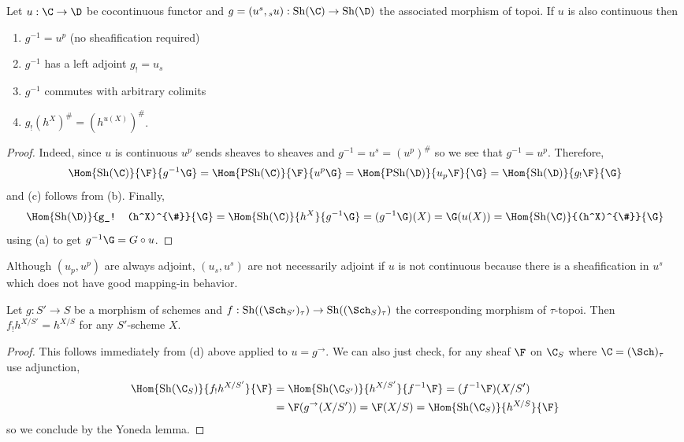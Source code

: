 \documentclass[12pt]{article}
\begin{document}
\begin{lemma}
Let $u : \C \to \D$ be cocontinuous functor and $g = (u^s, {}_s u) : \Sh(\C) \to \Sh(\D)$ the associated morphism of topoi. If $u$ is also continuous then
\begin{enumerate}
\item $g^{-1} = u^p$ (no sheafification required)
\item $g^{-1}$ has a left adjoint $g_! = u_s$
\item $g^{-1}$ commutes with arbitrary colimits
\item $g_! (h^{X})^{\#} = (h^{u(X)})^{\#}$.
\end{enumerate}
\end{lemma}

\begin{proof}
Indeed, since $u$ is continuous $u^p$ sends sheaves to sheaves and $g^{-1} = u^s = (u^p)^{\#}$ so we see that $g^{-1} = u^p$. Therefore, 
\begin{align*}
\Hom{\Sh(\C)}{\F}{g^{-1} \G} = \Hom{\PSh(\C)}{\F}{u^p \G} = \Hom{\PSh(\D)}{u_p \F}{\G} = \Hom{\Sh(\D)}{g_! \F}{\G} 
\end{align*}
and (c) follows from (b). Finally,
\[ \Hom{\Sh(\D)}{g_! (h^X)^{\#}}{\G} = \Hom{\Sh(\C)}{h^X}{g^{-1} \G} = (g^{-1} \G)(X) = \G(u(X)) = \Hom{\Sh(\C)}{(h^X)^{\#}}{\G} \]
using (a) to get $g^{-1} \G = G \circ u$.
\end{proof}

\begin{rmk}
Although $(u_p, u^p)$ are always adjoint, $(u_s, u^s)$ are not necessarily adjoint if $u$ is not continuous because there is a sheafification in $u^s$ which does not have good mapping-in behavior.
\end{rmk}


\begin{cor}
Let $g : S' \to S$ be a morphism of schemes and $f : \Sh((\Sch_{S'})_{\tau}) \to \Sh((\Sch_{S})_{\tau})$
the corresponding morphism of $\tau$-topoi. Then $f_! h^{X/S'} = h^{X/S}$ for any $S'$-scheme $X$.
\end{cor}

\begin{proof}
This follows immediately from (d) above applied to $u = g^{\to}$. We can also just check,
for any sheaf $\F$ on $\C_{S}$ where $\C = (\Sch)_{\tau}$ use adjunction,
\begin{align*}
\Hom{\Sh(\C_{S})}{f_! h^{X/S'}}{\F} & = \Hom{\Sh(\C_{S'})}{h^{X/S'}}{f^{-1} \F} = (f^{-1} \F)(X/S')
\\
& = \F(g^{\to}(X/S')) = \F(X/S) = \Hom{\Sh(\C_{S})}{h^{X/S}}{\F}
\end{align*}
so we conclude by the Yoneda lemma.
\end{proof}
\end{document}
